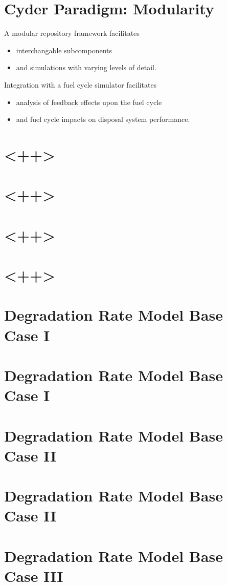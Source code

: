 \documentclass[letterpaper]{article}
\begin{document}
\section*{Cyder Paradigm: Modularity}
A modular repository framework facilitates
\begin{itemize}
\item interchangable subcomponents
\item and simulations with varying levels of detail.
\end{itemize}
Integration with a fuel cycle simulator facilitates
\begin{itemize}
\item analysis of feedback effects upon the fuel cycle
\item and fuel cycle impacts on disposal system performance.
\end{itemize}

\section*{<++>}
\section*{<++>}
\section*{<++>}
\section*{<++>}
\section*{Degradation Rate Model Base Case I}
\section*{Degradation Rate Model Base Case I}
\section*{Degradation Rate Model Base Case II}
\section*{Degradation Rate Model Base Case II}
\section*{Degradation Rate Model Base Case III}
\end{document}

